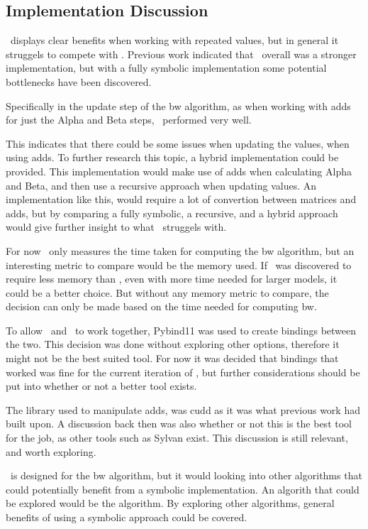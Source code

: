 \subsection{Implementation Discussion} \label{subsec:implementation_discussion}
\Cupaal\ displays clear benefits when working with repeated values, but in general it struggels to compete with \Jajapy.
Previous work indicated that \Cupaal\ overall was a stronger implementation, but with a fully symbolic implementation some potential bottlenecks have been discovered.

Specifically in the update step of the \gls{bw} algorithm, as when working with \glspl{add} for just the Alpha and Beta steps, \Cupaal\ performed very well.

This indicates that there could be some issues when updating the values, when using \glspl{add}.
To further research this topic, a hybrid implementation could be provided.
This implementation would make use of \glspl{add} when calculating Alpha and Beta, and then use a recursive approach when updating values.
An implementation like this, would require a lot of convertion between matrices and \glspl{add}, but by comparing a fully symbolic, a recursive, and a hybrid approach would give further insight to what \Cupaal\ struggels with.

For now \Cupaal\ only measures the time taken for computing the \gls{bw} algorithm, but an interesting metric to compare would be the memory used.
If \Cupaal\ was discovered to require less memory than \Jajapy, even with more time needed for larger models, it could be a better choice.
But without any memory metric to compare, the decision can only be made based on the time needed for computing \gls{bw}.

To allow \Cupaal\ and \Jajapy\ to work together, Pybind11 was used to create bindings between the two.
This decision was done without exploring other options, therefore it might not be the best suited tool.
For now it was decided that bindings that worked was fine for the current iteration of \Cupaal, but further considerations should be put into whether or not a better tool exists.

The library used to manipulate \glspl{add}, was \gls{cudd} as it was what previous work had built upon.
A discussion back then was also whether or not this is the best tool for the job, as other tools such as Sylvan exist.
This discussion is still relevant, and worth exploring.

\Cupaal\ is designed for the \gls{bw} algorithm, but it would looking into other algorithms that could potentially benefit from a symbolic implementation.
An algorith that could be explored would be the  algorithm.
By exploring other algorithms, general benefits of using a symbolic approach could be covered.

